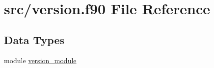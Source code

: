\hypertarget{version_8f90}{\section{src/version.f90 File Reference}
\label{version_8f90}
}
\subsection*{Data Types}
\begin{DoxyCompactItemize}
\item 
module \hyperlink{classversion__module}{version\-\_\-module}
\end{DoxyCompactItemize}
